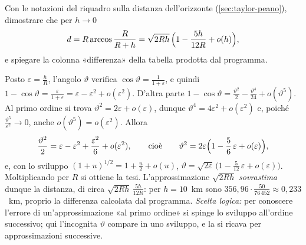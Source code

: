 \begin{esercizio}\label{es:orizzonte-secondo-ordine}
Con le notazioni del riquadro sulla distanza dell'orizzonte (\cref{sec:taylor-peano}),
dimostrare che per $h\to0$
\[
  d=R\arccos\frac R{R+h}=\sqrt{2Rh}\,\Bigl(1-\frac{5h}{12R}+o(h)\Bigr) ,
\]
e spiegare la colonna «differenza» della tabella prodotta dal programma.
\begin{soluzione}
Posto $\varepsilon=\frac hR$, l'angolo $\vartheta$ verifica $\cos\vartheta=\frac1{1+\varepsilon}$, e quindi
$1-\cos\vartheta=\frac\varepsilon{1+\varepsilon}=\varepsilon-\varepsilon^{2}+o(\varepsilon^{2})$. D'altra parte
$1-\cos\vartheta=\frac{\vartheta^{2}}2-\frac{\vartheta^{4}}{24}+o(\vartheta^{5})$. Al primo ordine si trova
$\vartheta^{2}=2\varepsilon+o(\varepsilon)$, dunque $\vartheta^{4}=4\varepsilon^{2}+o(\varepsilon^{2})$ e, poiché
$\frac{\vartheta^{5}}{\varepsilon^{2}}\to0$, anche $o(\vartheta^{5})=o(\varepsilon^{2})$. Allora
\[
  \frac{\vartheta^{2}}2=\varepsilon-\varepsilon^{2}+\frac{\varepsilon^{2}}6+o(\varepsilon^{2}) ,
  \qquad\text{cioè}\qquad
  \vartheta^{2}=2\varepsilon\Bigl(1-\frac56\,\varepsilon+o(\varepsilon)\Bigr) ,
\]
e, con lo sviluppo $(1+u)^{1/2}=1+\frac u2+o(u)$, $\vartheta=\sqrt{2\varepsilon}\,\bigl(1-\frac5{12}\,\varepsilon+o(\varepsilon)\bigr)$.
Moltiplicando per $R$ si ottiene la tesi. L'approssimazione $\sqrt{2Rh}$ \emph{sovrastima}
dunque la distanza, di circa $\sqrt{2Rh}\,\frac{5h}{12R}$: per $h=10$~km sono
$356{,}96\cdot\frac{50}{76\,452}\approx0{,}233$~km, proprio la differenza calcolata dal programma.
\emph{Scelta logica:} per conoscere l'errore di un'approssimazione «al primo ordine» si
spinge lo sviluppo all'ordine successivo; qui l'incognita $\vartheta$ compare in uno
sviluppo, e la si ricava per approssimazioni successive.
\end{soluzione}
\end{esercizio}

